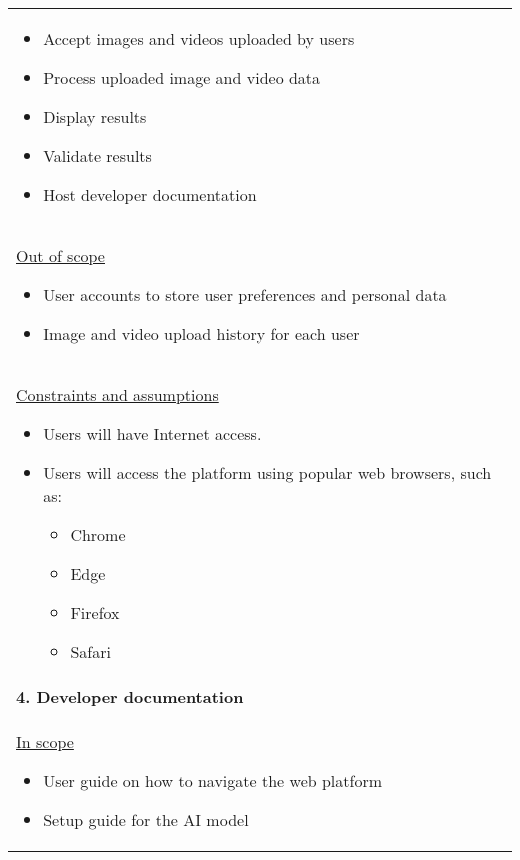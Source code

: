 \begin{longtable}{ | p{} l | }
{        \begin{itemize}
            \item Accept images and videos uploaded by users
            \item Process uploaded image and video data
            \item Display results
            \item Validate results
            \item Host developer documentation
        \end{itemize}
    } \\
    \multicolumn{2}{|p{\textwidth}|}{\hspace{0.6cm}\underline{Out of scope}
        \begin{itemize}
            \item User accounts to store user preferences and personal data
            \item Image and video upload history for each user
        \end{itemize}
    } \\
    \multicolumn{2}{|p{\textwidth}|}{\hspace{0.6cm}\underline{Constraints and assumptions}
        \begin{itemize}
            \item Users will have Internet access.
            \item Users will access the platform using popular web browsers, such as:
                \begin{itemize}
                    \item Chrome
                    \item Edge
                    \item Firefox
                    \item Safari
                \end{itemize}
        \end{itemize}
    } \\
    \multicolumn{2}{|p{\textwidth}|}{\textbf{4. Developer documentation}} \\
    \multicolumn{2}{|p{\textwidth}|}{\hspace{0.6cm}\underline{In scope}
        \begin{itemize}
            \item User guide on how to navigate the web platform
            \item Setup guide for the AI model
        \end{itemize}
}
\end{longtable}
